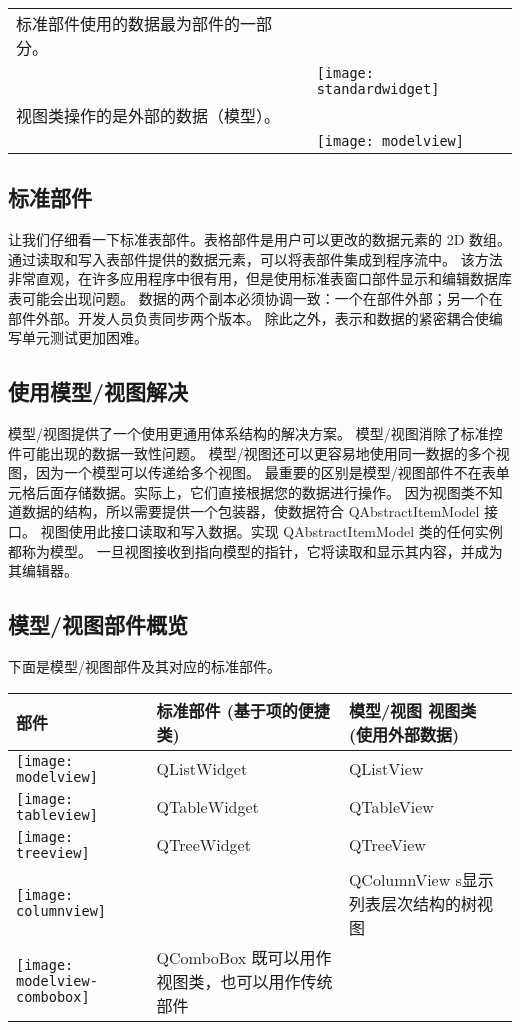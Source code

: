 \begin{longtable}{|l|m{25em}|}
\hline
标准部件使用的数据最为部件的一部分。\\
&
\texttt{[image: standardwidget]} \\ 
\hline	
视图类操作的是外部的数据（模型）。\\
&
\texttt{[image: modelview]} \\ 
\hline	
\end{longtable}

\subsection{标准部件}

让我们仔细看一下标准表部件。表格部件是用户可以更改的数据元素的 2D 数组。
通过读取和写入表部件提供的数据元素，可以将表部件集成到程序流中。
该方法非常直观，在许多应用程序中很有用，但是使用标准表窗口部件显示和编辑数据库表可能会出现问题。
数据的两个副本必须协调一致：一个在部件外部；另一个在部件外部。开发人员负责同步两个版本。
除此之外，表示和数据的紧密耦合使编写单元测试更加困难。

\subsection{使用模型/视图解决}

模型/视图提供了一个使用更通用体系结构的解决方案。
模型/视图消除了标准控件可能出现的数据一致性问题。
模型/视图还可以更容易地使用同一数据的多个视图，因为一个模型可以传递给多个视图。
最重要的区别是模型/视图部件不在表单元格后面存储数据。实际上，它们直接根据您的数据进行操作。
因为视图类不知道数据的结构，所以需要提供一个包装器，使数据符合 QAbstractItemModel 接口。
视图使用此接口读取和写入数据。实现 QAbstractItemModel 类的任何实例都称为模型。
一旦视图接收到指向模型的指针，它将读取和显示其内容，并成为其编辑器。

\subsection{模型/视图部件概览}

下面是模型/视图部件及其对应的标准部件。

\begin{longtable}{|l|m{15em}|m{10em}|}
\hline
部件 & 标准部件 (基于项的便捷类) & 模型/视图 视图类 (使用外部数据) \\ 
\hline
\texttt{[image: modelview]}  
&
QListWidget
&
QListView  \\
\hline
\texttt{[image: tableview]}  
&
QTableWidget	
&
QTableView \\
\hline
\texttt{[image: treeview]}  
&
QTreeWidget	
&
QTreeView  \\
\hline
\texttt{[image: columnview]}  
&

&
QColumnView s显示列表层次结构的树视图  \\
\hline
\texttt{[image: modelview-combobox]}  
&
QComboBox 既可以用作视图类，也可以用作传统部件
&
  \\
\hline
\end{longtable}




